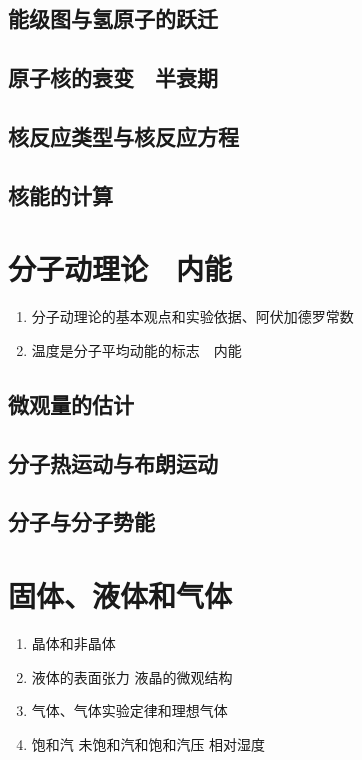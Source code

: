 \documentclass[cn,11pt, simple]{elegantbook}
\begin{document}
\clearpage\section{能级图与氢原子的跃迁}

\clearpage\section{原子核的衰变　半衰期}

\clearpage\section{核反应类型与核反应方程}

\clearpage\section{核能的计算}

\chapter{分子动理论　内能}
\begin{enumerate}
   \item 分子动理论的基本观点和实验依据、阿伏加德罗常数
   \item 温度是分子平均动能的标志　内能
\end{enumerate}

\clearpage\section{微观量的估计}

\clearpage\section{分子热运动与布朗运动}

\clearpage\section{分子与分子势能}

\chapter{固体、液体和气体}
\begin{enumerate}
   \item 晶体和非晶体
   \item 液体的表面张力  液晶的微观结构
   \item 气体、气体实验定律和理想气体
   \item 饱和汽  未饱和汽和饱和汽压  相对湿度
\end{enumerate}
\end{document}
